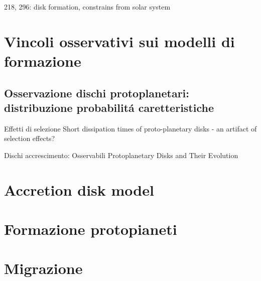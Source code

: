 218, 296: disk formation, constrains from solar system

\chapter{Vincoli osservativi sui modelli di formazione}


\section{Osservazione dischi protoplanetari: distribuzione probabilit\'a caretteristiche}

\begin{workout}{Effetti di selezione}
Short dissipation times of proto-planetary disks - an artifact of selection effects?
\end{workout}

\begin{workout}{Dischi accrescimento: Osservabili}
Protoplanetary Disks and Their Evolution
\end{workout}

\chapter{Accretion disk model}


\chapter{Formazione protopianeti}

\chapter{Migrazione}
